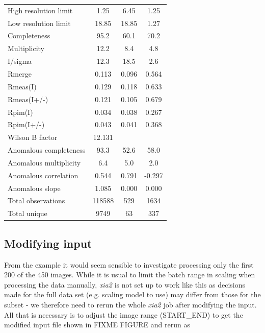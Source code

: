 \documentclass[a4paper, 11pt]{article}
\begin{document}
\begin{tabular}{lccc}
High resolution limit      &       1.25 &    6.45 &   1.25\\
Low resolution limit       &                18.85  & 18.85  &  1.27\\
Completeness               &                95.2   & 60.1  &  70.2\\
Multiplicity               &               12.2    & 8.4   &  4.8\\
I/sigma                    &               12.3    & 18.5   &  2.6\\
Rmerge                     &             0.113  & 0.096 &  0.564\\
Rmeas(I)                   &             0.129  & 0.118 &  0.633\\
Rmeas(I+/-)                &             0.121  & 0.105 &  0.679\\
Rpim(I)                    &             0.034  & 0.038 &  0.267\\
Rpim(I+/-)                 &             0.043  & 0.041 &  0.368\\
Wilson B factor            &            12.131& & \\
Anomalous completeness     &            93.3  &  52.6  &  58.0\\
Anomalous multiplicity     &           6.4    & 5.0  &   2.0\\
Anomalous correlation      &            0.544 &  0.791 & -0.297\\
Anomalous slope            &      1.085 &  0.000 &  0.000\\
Total observations         &       118588 & 529  &   1634\\
Total unique               &         9749  &  63 &     337\\
\end{tabular}

\subsection{Modifying input}

From the example it would seem sensible to investigate processing only the
first 200 of the 450 images. While it is usual to limit the batch range in 
scaling when processing the data manually, \emph{xia2} is not set up to 
work like this as decisions made for the full data set (e.g. scaling model
to use) may differ from those for the subset - we therefore need to rerun the
whole \emph{xia2} job after modifying the input. All that is necessary is to 
adjust the image range (START\_END) to get the modified input file shown in 
FIXME FIGURE and rerun as 
\end{document}
